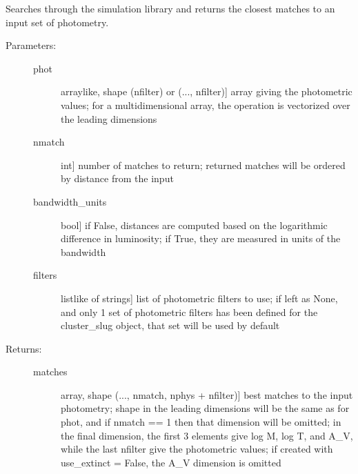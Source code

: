 \documentclass[letterpaper,10pt,english]{sphinxmanual}
\begin{document}
\begin{fulllineitems}
\begin{fulllineitems}
\begin{description}
\end{description}

\end{fulllineitems}


\begin{fulllineitems}
\label{cluster_slug:slugpy.cluster_slug.cluster_slug.bestmatch}
Searches through the simulation library and returns the closest
matches to an input set of photometry.
\begin{description}
\item[{Parameters:}] \leavevmode\begin{description}
\item[{phot}] \leavevmode{[}arraylike, shape (nfilter) or (..., nfilter){]}
array giving the photometric values; for a
multidimensional array, the operation is vectorized over
the leading dimensions

\item[{nmatch}] \leavevmode{[}int{]}
number of matches to return; returned matches will be
ordered by distance from the input

\item[{bandwidth\_units}] \leavevmode{[}bool{]}
if False, distances are computed based on the
logarithmic difference in luminosity; if True, they are
measured in units of the bandwidth

\item[{filters}] \leavevmode{[}listlike of strings{]}
list of photometric filters to use; if left as None, and
only 1 set of photometric filters has been defined for
the cluster\_slug object, that set will be used by
default

\end{description}

\item[{Returns:}] \leavevmode\begin{description}
\item[{matches}] \leavevmode{[}array, shape (..., nmatch, nphys + nfilter){]}
best matches to the input photometry; shape in the
leading dimensions will be the same as for phot, and if
nmatch == 1 then that dimension will be omitted; in the
final dimension, the first 3 elements give log M, log T,
and A\_V, while the last nfilter give the photometric
values; if created with use\_extinct = False, the A\_V
dimension is omitted


\end{description}
\end{description}
\end{fulllineitems}
\end{fulllineitems}
\end{document}
